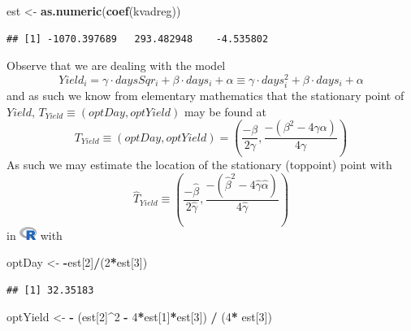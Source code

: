 \documentclass[
]{article}
\newenvironment{Shaded}{\begin{snugshade}}{\end{snugshade}}
\newcommand{\DecValTok}[1]{\textcolor[rgb]{0.00,0.00,0.81}{#1}}
\newcommand{\KeywordTok}[1]{\textcolor[rgb]{0.13,0.29,0.53}{\textbf{#1}}}
\newcommand{\NormalTok}[1]{#1}
\newcommand{\OperatorTok}[1]{\textcolor[rgb]{0.81,0.36,0.00}{\textbf{#1}}}
\newcommand{\StringTok}[1]{\textcolor[rgb]{0.31,0.60,0.02}{#1}}
\begin{document}
\begin{Shaded}
\begin{Highlighting}[]
\NormalTok{est <-}\StringTok{ }\KeywordTok{as.numeric}\NormalTok{(}\KeywordTok{coef}\NormalTok{(kvadreg))}
\end{Highlighting}
\end{Shaded}

\begin{verbatim}
## [1] -1070.397689   293.482948    -4.535802
\end{verbatim}

Observe that we are dealing with the model \[
Yield_i=\gamma\cdot daysSqr_i+\beta\cdot days_i+\alpha\equiv\gamma\cdot days_i^2+\beta\cdot days_i+\alpha
\] and as such we know from elementary mathematics that the stationary
point of \(Yield,\,T_{Yield}\equiv\left({optDay,optYield}\right)\) may
be found at \[
T_{Yield}\equiv\left({optDay,optYield}\right)=\left({\frac{-\beta}{2\gamma},\frac{-\left({\beta^2-4\gamma\alpha}\right)}{4\gamma}}\right)
\] As such we may estimate the location of the stationary (toppoint)
point with \[
\hat T_{Yield}\equiv\left({\frac{-\hat\beta}{2\hat\gamma},\frac{-\left({\hat\beta^2-4\hat\gamma\hat\alpha}\right)}{4\hat\gamma}}\right)
\] in \includegraphics[width=\textwidth,height=0.16667in]{R_logo.png}
with

\begin{Shaded}
\begin{Highlighting}[]
\NormalTok{optDay <-}\StringTok{ }\OperatorTok{-}\NormalTok{est[}\DecValTok{2}\NormalTok{]}\OperatorTok{/}\NormalTok{(}\DecValTok{2}\OperatorTok{*}\NormalTok{est[}\DecValTok{3}\NormalTok{])}
\end{Highlighting}
\end{Shaded}

\begin{verbatim}
## [1] 32.35183
\end{verbatim}

\begin{Shaded}
\begin{Highlighting}[]
\NormalTok{optYield <-}\StringTok{ }\OperatorTok{-}\StringTok{ }\NormalTok{(est[}\DecValTok{2}\NormalTok{]}\OperatorTok{^}\DecValTok{2} \OperatorTok{-}\StringTok{ }\DecValTok{4}\OperatorTok{*}\NormalTok{est[}\DecValTok{1}\NormalTok{]}\OperatorTok{*}\NormalTok{est[}\DecValTok{3}\NormalTok{]) }\OperatorTok{/}\StringTok{ }\NormalTok{(}\DecValTok{4}\OperatorTok{*}\StringTok{ }\NormalTok{est[}\DecValTok{3}\NormalTok{])}
\end{Highlighting}
\end{Shaded}
\end{document}
